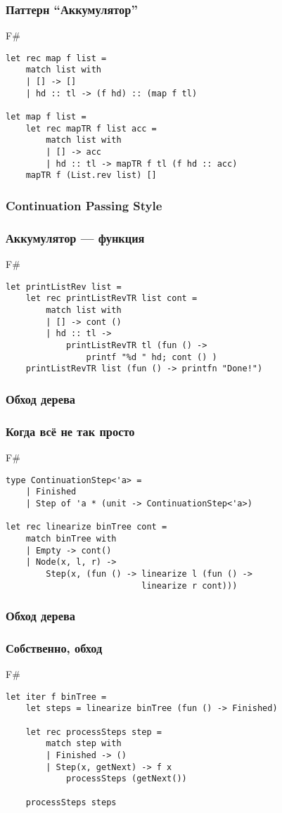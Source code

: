 \documentclass[xetex,mathserif,serif]{beamer}
\begin{document}
\begin{frame}[fragile]
	\frametitle{Паттерн ``Аккумулятор''}
	\begin{exampleblock}{F\#}
		\begin{lstlisting}
let rec map f list =
    match list with
    | [] -> []
    | hd :: tl -> (f hd) :: (map f tl)

let map f list =
    let rec mapTR f list acc =
        match list with
        | [] -> acc
        | hd :: tl -> mapTR f tl (f hd :: acc)
    mapTR f (List.rev list) []
\end{lstlisting}
\end{exampleblock}
	
\end{frame}

\begin{frame}[fragile]
	\frametitle{Continuation Passing Style}
	\frametitle{Аккумулятор --- функция}
	\begin{exampleblock}{F\#}
		\begin{lstlisting}
let printListRev list =
    let rec printListRevTR list cont =
        match list with
        | [] -> cont ()
        | hd :: tl ->
            printListRevTR tl (fun () -> 
                printf "%d " hd; cont () )
    printListRevTR list (fun () -> printfn "Done!")
\end{lstlisting}
\end{exampleblock}
	
\end{frame}

\begin{frame}[fragile]
	\frametitle{Обход дерева}
	\frametitle{Когда всё не так просто}
	\begin{exampleblock}{F\#}
		\begin{lstlisting}
type ContinuationStep<'a> =
    | Finished
    | Step of 'a * (unit -> ContinuationStep<'a>)
    
let rec linearize binTree cont =
    match binTree with
    | Empty -> cont()
    | Node(x, l, r) ->
        Step(x, (fun () -> linearize l (fun () -> 
                           linearize r cont)))
\end{lstlisting}
\end{exampleblock}
	
\end{frame}

\begin{frame}[fragile]
	\frametitle{Обход дерева}
	\frametitle{Собственно, обход}
	\begin{exampleblock}{F\#}
		\begin{lstlisting}
let iter f binTree =
    let steps = linearize binTree (fun () -> Finished)

    let rec processSteps step =
        match step with
        | Finished -> ()
        | Step(x, getNext) -> f x
            processSteps (getNext())
    
    processSteps steps
\end{lstlisting}
\end{exampleblock}
	
\end{frame}
\end{document}
